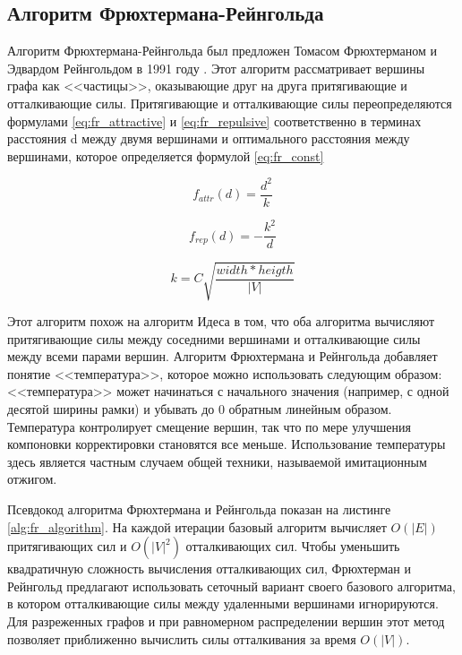 \documentclass[14pt, russian]{scrartcl}
\begin{document}
\newpage 

\subsection{Алгоритм Фрюхтермана-Рейнгольда }

Алгоритм Фрюхтермана-Рейнгольда был предложен Томасом Фрюхтерманом и Эдвардом Рейнгольдом в 1991 году \cite{FR}. Этот алгоритм рассматривает вершины графа как <<частицы>>, оказывающие друг на друга притягивающие и  отталкивающие силы. Притягивающие и отталкивающие
силы переопределяются формулами \ref{eq:fr_attractive} и \ref{eq:fr_repulsive} соответственно в терминах расстояния d между двумя вершинами и оптимального расстояния между вершинами, которое определяется формулой \ref{eq:fr_const}


\begin{equation}\label{eq:fr_attractive}
  f_{attr}(d) = \frac{d^2}{k}
\end{equation}

\begin{equation}\label{eq:fr_repulsive}
  f_{rep}(d) = -\frac{k^2}{d}
\end{equation}

\begin{equation}\label{eq:fr_const}
  k = C \sqrt{\frac{width * heigth}{|V|}}
\end{equation} 


Этот алгоритм похож на алгоритм Идеса в том, что оба алгоритма вычисляют притягивающие силы между соседними вершинами и отталкивающие силы между всеми парами вершин.
Алгоритм Фрюхтермана и Рейнгольда добавляет понятие <<температура>>, которое можно использовать следующим образом: <<температура>> может начинаться с начального значения (например, с одной десятой ширины рамки) и убывать до 0 обратным линейным образом. Температура контролирует смещение вершин, так что по мере улучшения компоновки корректировки становятся все меньше. Использование температуры здесь является частным случаем общей техники, называемой имитационным отжигом.

Псевдокод алгоритма Фрюхтермана и Рейнгольда показан на листинге \ref{alg:fr_algorithm}. На каждой итерации базовый алгоритм вычисляет $O(|E|)$ притягивающих сил и $O(|V|^2)$ отталкивающих сил. Чтобы уменьшить квадратичную сложность вычисления отталкивающих сил, Фрюхтерман и Рейнгольд предлагают использовать сеточный вариант своего базового алгоритма, в котором отталкивающие силы между удаленными вершинами игнорируются. Для разреженных графов и при равномерном распределении вершин этот метод позволяет приближенно вычислить силы отталкивания за время $O(|V|)$.
\end{document}
